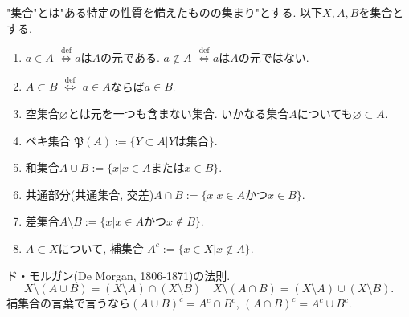 \documentclass[dvipdfmx,a4paper,11pt]{article}
\theoremstyle{definition}
\begin{document}
\begin{tcolorbox}[
    colback = white,
    colframe = black!35!black,
    fonttitle = \bfseries,
    breakable = true]
    "集合"とは"ある特定の性質を備えたものの集まり"とする.
    以下$X, A,B$を集合とする. 
    \begin{enumerate}
    \setlength{\parskip}{0cm} 
  \setlength{\itemsep}{0cm} 
    \item$a \in A$ $\stackrel{\mathrm{def}}{\Longleftrightarrow}$$a$は$A$の元である. $a \not \in A$ $\stackrel{\mathrm{def}}{\Longleftrightarrow}$$a$は$A$の元ではない.
    \item $A \subset B$ $\stackrel{\mathrm{def}}{\Longleftrightarrow}$ $a \in A$ならば$a \in B$.
     \item 空集合$\varnothing$とは元を一つも含まない集合. いかなる集合$A$についても$\varnothing \subset A$.
    \item ベキ集合 $\mathfrak{P}(A):=\{ Y\subset A | \text{$Y$は集合}\}$.
    \item 和集合$A \cup B := \{ x | x \in A \text{または} x \in B\}$.
    \item 共通部分(共通集合, 交差)$A \cap B := \{ x | x \in A \text{かつ} x \in B\}$.
    \item 差集合$A \setminus  B := \{ x | x \in A \text{かつ} x \not \in B\}$.
    \item $A \subset X$について, 補集合 $A^c:=\{ x \in X | x \not \in A\}$.
    \end{enumerate}
   ド・モルガン(De Morgan, 1806-1871)の法則.
   $$
  X \setminus (A \cup B) = (X \setminus A) \cap (X \setminus B)
   \quad
   X \setminus (A \cap B) = (X \setminus A) \cup (X \setminus B).
   $$
   補集合の言葉で言うなら$(A \cup B)^c = A^c \cap B^c$, $(A \cap B)^c = A^c \cup B^c$.
 \end{tcolorbox}
 
\end{document}
